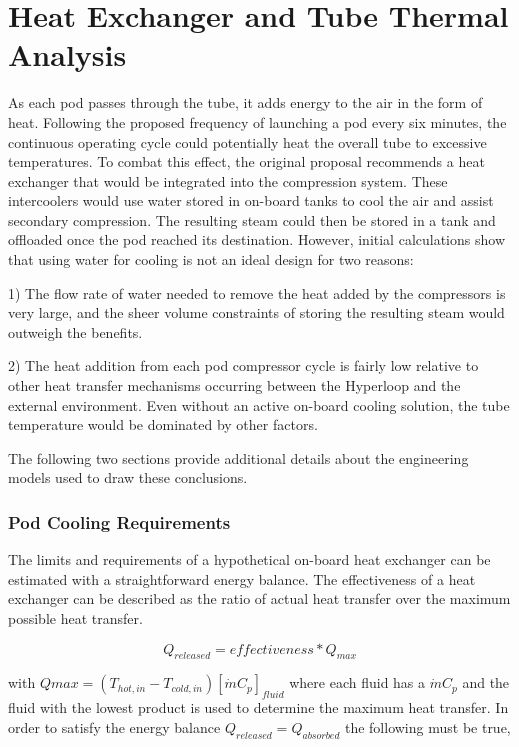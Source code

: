 \documentclass[heading.tex]{subfiles}
\begin{document}
\section{Heat Exchanger and Tube Thermal Analysis}
\label{s:heatex}
As each pod passes through the tube, it adds energy to the air in the form of heat.
Following the proposed frequency of launching a pod every six minutes,
the continuous operating cycle could potentially heat the overall tube to excessive temperatures.
To combat this effect, the original proposal recommends a heat exchanger that would be integrated into the compression system.
These intercoolers would use water stored in on-board tanks to cool the air and assist secondary compression.
The resulting steam could then be stored in a tank and offloaded once the pod reached its destination.
However, initial calculations show that using water for cooling is not an ideal design for two reasons:

1) The flow rate of water needed to remove the heat added by the compressors is very large, and the sheer volume constraints of storing
the resulting steam would outweigh the benefits.

2) The heat addition from each pod compressor cycle is fairly low relative to other heat transfer mechanisms occurring between the Hyperloop
and the external environment. Even without an active on-board cooling solution, the tube temperature would be dominated by other factors.

The following two sections provide additional details about the engineering models used to draw these conclusions.

\subsubsection{Pod Cooling Requirements}

The limits and requirements of a hypothetical on-board heat exchanger can be estimated with a straightforward energy balance. The
effectiveness of a heat exchanger can be described as the ratio of actual heat transfer over the maximum possible heat transfer.

\begin{equation}
{Q}_{released}  = effectiveness * {Q}_{max}
\end{equation}


with $Qmax=\left(T_{hot,in} - T_{cold,in}\right) [ \dot{m} C_{p} ]_{fluid}$ where each fluid has a $\dot{m} C_{p}$ and the fluid with the lowest
product is used to determine the maximum heat transfer. In order to satisfy the energy balance $Q_{released}=Q_{absorbed}$ the following must be true,
\end{document}
